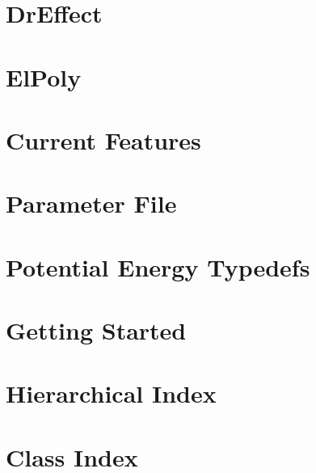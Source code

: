 \documentclass[twoside]{article}
\newcommand{\+}{\discretionary{\mbox{\scriptsize$\hookleftarrow$}}{}{}}
\begin{document}
\section{Dr\+Effect}
\label{DrEffect_page}
\hypertarget{DrEffect_page}{}

\section{El\+Poly}
\label{ElPoly_page}
\hypertarget{ElPoly_page}{}

\section{Current Features}
\label{features_page}
\hypertarget{features_page}{}

\section{Parameter File}
\label{param_page}
\hypertarget{param_page}{}

\section{Potential Energy Typedefs}
\label{typedef_page}
\hypertarget{typedef_page}{}

\section{Getting Started}
\label{usage_page}
\hypertarget{usage_page}{}

\section{Hierarchical Index}

\section{Class Index}

\end{document}
